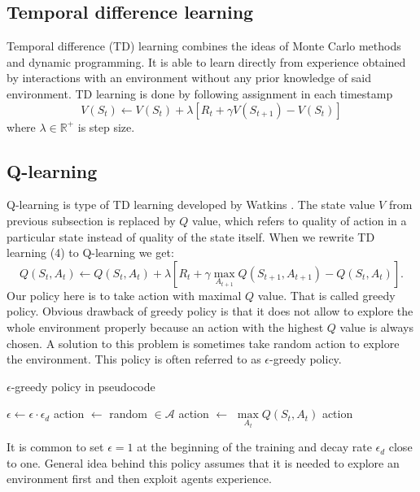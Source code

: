 \subsection{Temporal difference learning}
Temporal difference (TD) learning combines the ideas of Monte Carlo methods and dynamic programming. It is able to learn directly from experience obtained by interactions with an environment without any prior knowledge of said environment. TD learning is done by following assignment in each timestamp \cite{sutton2012}
\begin{equation}
V(S_t) \gets V(S_t) + \lambda [R_{t} + \gamma V(S_{t+1}) - V(S_t)]
\end{equation}
where $\lambda \in \mathbb{R}^+$ is step size.

\subsection{Q-learning}
Q-learning is type of TD learning developed by Watkins \cite{watkins1992}. The state value $V$ from previous subsection is replaced by $Q$ value, which refers to quality of action in a particular state instead of quality of the state itself. When we rewrite TD learning (4) to Q-learning we get:
\begin{equation}
Q(S_t, A_t) \gets Q(S_t, A_t) + \lambda [R_{t} + \gamma \underset{A_{t+1}}{\max} Q(S_{t+1}, A_{t+1}) - Q(S_t, A_t)].
\end{equation}
Our policy here is to take action with maximal $Q$ value. That is called greedy policy. Obvious drawback of greedy policy is that it does not allow to explore the whole environment properly because an action with the highest $Q$ value is always chosen. A solution to this problem is sometimes take random action to explore the environment. This policy is often referred to as $\epsilon$-greedy policy.

\begin{algorithm}
\caption{$\epsilon$-greedy policy in pseudocode}
\begin{algorithmic}[1]
\State $\epsilon \gets \epsilon \cdot \epsilon_d$
\State action $\gets$ random $\in \mathcal{A}$
\Else 
\State action $\gets$ $\underset{A_t}{\max} Q(S_t, A_t)$
\EndIf
\State \Return action
\EndProcedure
\end{algorithmic}
\end{algorithm}

It is common to set $\epsilon = 1$ at the beginning of the training and decay rate $\epsilon_d$ close to one. General idea behind this policy assumes that it is needed to explore an environment first and then exploit agents experience.

